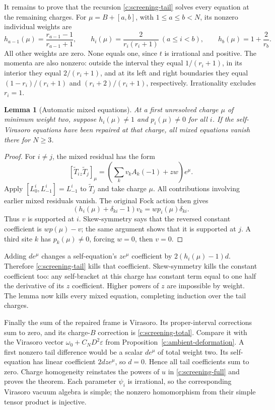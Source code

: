 \documentclass[11pt,a4paper]{article}
\numberwithin{equation}{section}
\newtheorem{lemma}[theorem]{Lemma}
\theoremstyle{definition}\newtheorem{definition}[theorem]{Definition}
\theoremstyle{remark}\newtheorem{remark}[theorem]{Remark}
\begin{document}
It remains to prove that the recursion \eqref{c:screening-tail} solves every equation at the remaining charges. For $\mu=B+[a,b]$, with $1\le a\le b<N$, its nonzero individual weights are
\[
 h_{a-1}(\mu)=\frac{r_{a-1}-1}{r_{a-1}+1},\qquad
 h_i(\mu)=\frac{2}{r_i(r_i+1)}\ (a\le i<b),\qquad
 h_b(\mu)=1+\frac2{r_b}.
\]
All other weights are zero. None equals one, since $t$ is irrational and positive. The momenta are also nonzero: outside the interval they equal
$1/(r_i+1)$, in its interior they equal $2/(r_i+1)$, and at its
left and right boundaries they equal $(1-r_i)/(r_i+1)$ and
$(r_i+2)/(r_i+1)$, respectively. Irrationality excludes $r_i=1$.

\begin{lemma}[Automatic mixed equations]\label{c:automatic-mixed}
At a first unresolved charge $\mu$ of minimum weight two, suppose $h_i(\mu)\ne1$ and $p_i(\mu)\ne0$ for all $i$. If the self-Virasoro equations have been repaired at that charge, all mixed equations vanish there for $N\ge3$.
\end{lemma}
\begin{proof}
For $i\ne j$, the mixed residual has the form
\[
 [\widetilde T_i{}_{z}\widetilde T_j]_\mu
   =\left(\sum_k v_kA_k(-1)+zw\right)e^\mu.
\]
Apply $[L_0^i,L_{-1}^i]=L_{-1}^i$ to $\widetilde T_j$ and take charge $\mu$. All contributions involving earlier mixed residuals vanish. The original Fock action then gives
\[
 (h_i(\mu)+\delta_{ki}-1)v_k=w p_i(\mu)\delta_{ki}.
\]
Thus $v$ is supported at $i$. Skew-symmetry says that the reversed constant coefficient is $wp(\mu)-v$; the same argument shows that it is supported at $j$. A third site $k$ has $p_k(\mu)\ne0$, forcing $w=0$, then $v=0$.
\end{proof}

Adding $d e^\mu$ changes a self-equation's $z e^\mu$ coefficient by $2(h_i(\mu)-1)d$. Therefore \eqref{c:screening-tail} kills that coefficient. Skew-symmetry kills the constant coefficient too: any self-bracket at this charge has constant term equal to one half the derivative of its $z$ coefficient. Higher powers of $z$ are impossible by weight. The lemma now kills every mixed equation, completing induction over the tail charges.

Finally the sum of the repaired frame is Virasoro. Its proper-interval corrections sum to zero, and its charge-$B$ correction is \eqref{c:screening-total}. Compare it with the Virasoro vector $\omega_0+C_ND^2\varepsilon$ from Proposition~\ref{c:ambient-deformation}. A first nonzero tail difference would be a scalar $d e^\mu$ of total weight two. Its self-equation has linear coefficient $2d z e^\mu$, so $d=0$. Hence all tail coefficients sum to zero. Charge homogeneity reinstates the powers of $u$ in \eqref{c:screening-full} and proves the theorem. Each parameter $\psi_i$ is irrational, so the corresponding Virasoro vacuum algebra is simple; the nonzero homomorphism from their simple tensor product is injective.
\end{document}
